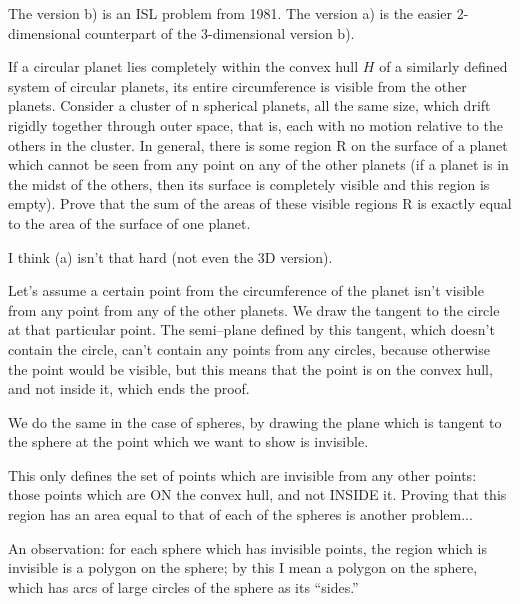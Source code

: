\documentclass[12pt,a4paper]{memoir}
\theoremstyle{definition}
\begin{document}
\begin{question}[name={1981 IMO Shortlist and Beyond}]
	The version b) is an ISL problem from 1981. The version a) is the easier 2-dimensional counterpart of the 3-dimensional version b).
	\begin{tasks}
		\task If a circular planet lies completely within the convex hull $H$ of a similarly defined system of circular planets, its entire circumference is visible from the other planets.
		\task Consider a cluster of n spherical planets, all the same size, which drift rigidly together through outer space, that is, each with no motion relative to the others in the cluster. In general, there is some region R on the surface of a planet which cannot be seen from any point on any of the other planets (if a planet is in the midst of the others, then its surface is completely visible and this region is empty). Prove that the sum of the areas of these visible regions R is exactly equal to the area of the surface of one planet.
	\end{tasks}
\end{question}



\begin{solution}[name={Solution by Grobber}] 
	I think (a) isn't that hard (not even the 3D version).
	
	Let's assume a certain point from the circumference of the planet isn't visible from any point from any of the other planets. We draw the tangent to the circle at that particular point. The semi--plane defined by this tangent, which doesn't contain the circle, can't contain any points from any circles, because otherwise the point would be visible, but this means that the point is on the convex hull, and not inside it, which ends the proof.
	
	We do the same in the case of spheres, by drawing the plane which is tangent to the sphere at the point which we want to show is invisible.
	
	This only defines the set of points which are invisible from any other points: those points which are ON the convex hull, and not INSIDE it. Proving that this region has an area equal to that of each of the spheres is another problem... 
	
	An observation: for each sphere which has invisible points, the region which is invisible is a polygon on the sphere; by this I mean a polygon on the sphere, which has arcs of large circles of the sphere as its ``sides.''
\end{solution}
\end{document}
